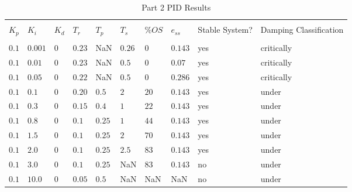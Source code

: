 \begin{table}[H]
	\begin{tabularx}{\textwidth}{XXXXXXXXXX}
		\toprule
		\\ $K_p$ & $K_i$ & $K_d$ & $T_r$ & $T_p$ & $T_s$ & $\%OS$ & $e_{ss}$ 
		& Stable System? & Damping Classification
		\\ \midrule
		\\ $0.1$ & $0.001$ & $0$ & $0.23$ & NaN & $0.26$ & $0$ & $0.143$ & yes & critically
\\ $0.1$ & $0.01$ & $0$  & $0.23$ & NaN & $0.5$ & $0$ & $0.07$ & yes & critically
\\ $0.1$ & $0.05$ & $0$  & $0.22$ & NaN & $0.5$ & $0$ & $0.286$ & yes & critically
\\ $0.1$ & $0.1$ & $0$  & $0.20$ & $0.5$ & $2$ & $20$ & $0.143$ & yes & under
\\ $0.1$ & $0.3$ & $0$  & $0.15$ & $0.4$ & $1$ & $22$ & $0.143$ & yes & under
\\ $0.1$ & $0.8$ & $0$  & $0.1$ & $0.25$ & $1$ & $44$ & $0.143$ & yes & under
\\ $0.1$ & $1.5$ & $0$  & $0.1$ & $0.25$ & $2$ & $70$ & $0.143$ & yes & under
\\ $0.1$ & $2.0$ & $0$  & $0.1$ & $0.25$ & $2.5$ & $83$ & $0.143$ & yes & under
\\ $0.1$ & $3.0$ & $0$  & $0.1$ & $0.25$ & NaN & $83$ & $0.143$ & no & under
\\ $0.1$ & $10.0$ & $0$  & $0.05$ & $0.5$ & NaN & NaN & NaN & no & under
		\\ \bottomrule
	\end{tabularx}
	\caption{Part 2 PID Results}
	\label{tab:pid2SimResults}
\end{table}
